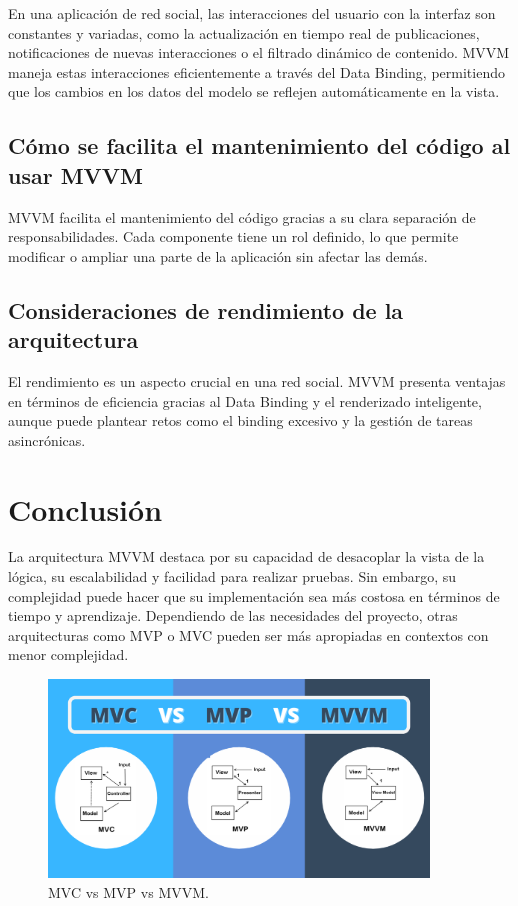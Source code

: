 \documentclass[letterpaper, 12pt]{report}
\begin{document}
En una aplicación de red social, las interacciones del usuario con la interfaz son constantes y variadas, como la actualización en tiempo real de publicaciones, notificaciones de nuevas interacciones o el filtrado dinámico de contenido. MVVM maneja estas interacciones eficientemente a través del Data Binding, permitiendo que los cambios en los datos del modelo se reflejen automáticamente en la vista.

\subsection{Cómo se facilita el mantenimiento del código al usar MVVM}

MVVM facilita el mantenimiento del código gracias a su clara separación de responsabilidades. Cada componente tiene un rol definido, lo que permite modificar o ampliar una parte de la aplicación sin afectar las demás.

\subsection{Consideraciones de rendimiento de la arquitectura}

El rendimiento es un aspecto crucial en una red social. MVVM presenta ventajas en términos de eficiencia gracias al Data Binding y el renderizado inteligente, aunque puede plantear retos como el binding excesivo y la gestión de tareas asincrónicas.

\newpage

\section{Conclusión}
La arquitectura MVVM destaca por su capacidad de desacoplar la vista de la lógica, su escalabilidad y facilidad para realizar pruebas. Sin embargo, su complejidad puede hacer que su implementación sea más costosa en términos de tiempo y aprendizaje. Dependiendo de las necesidades del proyecto, otras arquitecturas como MVP o MVC pueden ser más apropiadas en contextos con menor complejidad.

\begin{figure}[H]
\centering
\includegraphics[width=0.9\textwidth]{figure1.png}
\caption{MVC vs MVP vs MVVM.}
\label{fig:1}
\end{figure}

\newpage
\hspace{0pt} %
\end{document}
